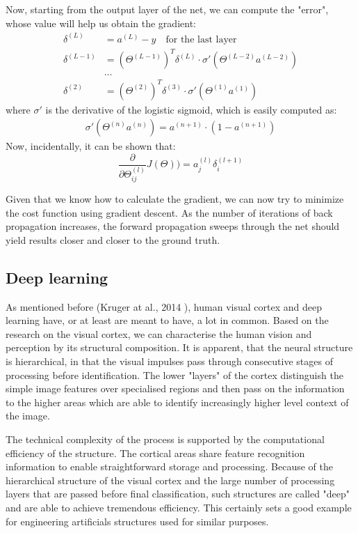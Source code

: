\documentclass[a4paper, 11pt]{article}
\numberwithin{equation}{section}
\begin{document}
		Now, starting from the output layer of the net, we can compute the "error", whose value will help us obtain the gradient:
		\begin{align}
		\delta^{(L)} &= a^{(L)} - y \quad \textrm{for the last layer} \\
		\delta^{(L-1)} &= (\Theta ^ {(L-1)})^T \delta^{(L)} \cdot \sigma'(\Theta^{(L-2)} a^{(L-2)}) \\
		&\ldots \\
		\delta^{(2)} &= (\Theta ^ {(2)})^T \delta^{(3)} \cdot \sigma'(\Theta^{(1)} a^{(1)})
		\end{align}
		where $\sigma'$ is the derivative of the logistic sigmoid, which is easily computed as:
		\begin{align}
		\sigma'(\Theta^{(n)} a^{(n)}) = a^{(n+1)} \cdot (1-a^{(n+1)})
		\end{align}
		Now, incidentally, it can be shown that:
		\begin{equation}
		\frac{\partial}{\partial \Theta_{ij}^{(l)}} J(\Theta)) = a_j^{(l)} \delta_i^{(l+1)}
		\end{equation}
		
		Given that we know how to calculate the gradient, we can now try to minimize the cost function using gradient descent. As the number of iterations of back propagation increases, the forward propagation sweeps through the net should yield results closer and closer to the ground truth.
		
		\subsection{Deep learning}
		
		As mentioned before (Kruger at al., 2014 \cite{kruger2013deep}), human visual cortex and deep learning have, or at least are meant to have, a lot in common. Based on the research on the visual cortex, we can characterise the human vision and perception by its structural composition. It is apparent, that the neural structure is hierarchical, in that the visual impulses pass through consecutive stages of processing before identification. The lower "layers" of the cortex distinguish the simple image features over specialised regions and then pass on the information to the higher areas which are able to identify increasingly higher level context of the image.
		
		The technical complexity of the process is supported by the computational efficiency of the structure. The cortical areas share feature recognition information to enable straightforward storage and processing. Because of the hierarchical structure of the visual cortex and the large number of processing layers that are passed before final classification, such structures are called "deep" and are able to achieve tremendous efficiency. This certainly sets a good example for engineering artificials structures used for similar purposes.
		
\end{document}

